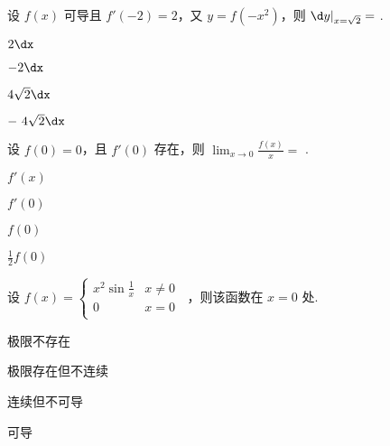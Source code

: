 \begin{problem}设 $f(x)$ 可导且 $f'\left( - 2 \right) = 2$，又
$y = f( - x^{2})$，则 ${\d y|}_{x = \sqrt{2}} =$ .

\begin{abcd} 
	
\item $2\dx$

\item $- 2\dx$

\item $4\sqrt{2}\dx$

\item $- \ 4\sqrt{2}\dx$

\end{abcd}

\end{problem}           


\begin{problem}设 $f\left( 0 \right) = 0$，且 $f'(0)$ 存在，则
$\displaystyle \lim_{x \rightarrow 0}{\frac{f\left( x \right)}{x} =}$ .

\begin{abcd} \item $f'\left( x \right)$

\item $f'\left( 0 \right)$

\item $f\left( 0 \right)$

\item $\frac{1}{2}f\left( 0 \right)$

\end{abcd}

\end{problem}           


\begin{problem}设 $f(x) = \left\{ \begin{matrix}
\displaystyle x^{2}\sin\frac{1}{x} & x \neq 0 \\
0 & x = 0 \\
\end{matrix} \right.\ $ ，则该函数在 $x = 0$ 处.

\begin{abcd} 
\item 极限不存在

\item 极限存在但不连续

\item 连续但不可导

\item 可导

\end{abcd}

\end{problem}           

